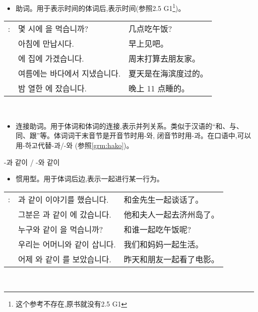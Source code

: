 \begin{grammar}
	\begin{grammarsect}[\kr -에]
		\begin{itemize}
			\item 助词。用于表示时间的体词后,表示时间(参照2.5 G1\footnote{这个参考不存在,原书就没有2.5 G1})。\\
		\end{itemize}
		\begin{tabular}{lll}
			\kr \ruby{例}{예}: &\kr 몇 시에 \ruby{點心}{점심}을 먹습니까?              & 几点吃午饭?     \\
			             & \kr 아침에 만납시다.                              & 早上见吧。      \\
			             & \kr \ruby{週末}{주말}에 \ruby{親舊}{친구} 집에 가겠습니다. & 周末打算去朋友家。  \\
			             & \kr 여름에는 바다에서 지냈습니다.                       & 夏天是在海滨度过的。 \\
			             & \kr 밤 열한 \ruby{時}{시}에 잤습니다.                & 晚上 11 点睡的。
		\end{tabular}\\
	\end{grammarsect}
	\begin{grammarsect}[\kr -과 / -와]\label{grm:ua}
		\begin{itemize}
			\item 连接助词。用于体词和体词的连接,表示并列关系。类似于汉语的“和、与、同、跟”等。体词词干末音节是开音节时用{\kr -와}, 闭音节时用{\kr -과}。在口语中,可以用{\kr -하고}代替{\kr -과/-와} (参照\ref{grm:hako})。
		\end{itemize}
		{\large \HandRight\kr  -과 같이 / -와 같이\\}
		\begin{itemize}
			\item 惯用型。用于体词后边,表示一起进行某一行为。\\
		\end{itemize}
		\begin{tabular}{lll}
			\kr \ruby{例}{예}: &\kr \ruby{金}{김} \ruby{先生}{선생}과 같이 이야기를 했습니다. &和金先生一起谈话了。\\
			&\kr 그분은 \ruby{夫人}{부인}과 같이 \ruby{濟州島}{제주도}에 갔습니다. &他和夫人一起去济州岛了。 \\
			&\kr 누구와 같이 \ruby{點心}{점심}을 먹습니까?&和谁一起吃午饭呢? \\
			&\kr 우리는 어머니와 같이 삽니다.&我们和妈妈一起生活。\\
			&\kr 어제 \ruby{親舊}{친구}와 같이 \ruby{映畫}{영화}를 보았습니다.&昨天和朋友一起看了电影。\\
	\end{tabular}\\
	\end{grammarsect}
\end{grammar}
